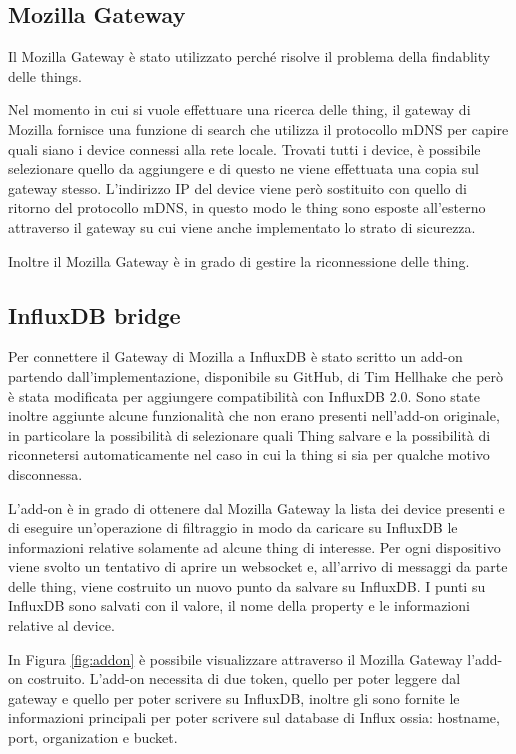 \documentclass{article}
\begin{document}
\subsection{Mozilla Gateway}
Il Mozilla Gateway è stato utilizzato perché risolve il problema della findablity delle things. 

Nel momento in cui si vuole effettuare una ricerca delle thing, il gateway di Mozilla fornisce una funzione di search che utilizza il protocollo mDNS per capire quali siano i device connessi alla rete locale. Trovati tutti i device, è possibile selezionare quello da aggiungere e di questo ne viene effettuata una copia sul gateway stesso.
L'indirizzo IP del device viene però sostituito con quello di ritorno del protocollo mDNS, in questo modo le thing sono esposte all'esterno attraverso il gateway su cui viene anche implementato lo strato di sicurezza. 

Inoltre il Mozilla Gateway è in grado di gestire la riconnessione delle thing.


\subsection{InfluxDB bridge}

Per connettere il Gateway di Mozilla a InfluxDB  è stato scritto un add-on partendo dall'implementazione, disponibile su GitHub, di Tim Hellhake \cite{influxdbBridge} che però è stata modificata per aggiungere compatibilità con InfluxDB 2.0. Sono state inoltre aggiunte alcune funzionalità che non erano presenti nell'add-on originale, in particolare la possibilità di selezionare quali Thing salvare e la possibilità di riconnetersi automaticamente nel caso in cui la thing si sia per qualche motivo disconnessa.


L'add-on è in grado di ottenere dal Mozilla Gateway la lista dei device presenti e di eseguire un'operazione di filtraggio in modo da caricare su InfluxDB le informazioni relative solamente ad alcune thing di interesse.
Per ogni dispositivo viene svolto un tentativo di aprire un websocket e, all'arrivo di messaggi da parte delle thing, viene costruito un nuovo punto da salvare su InfluxDB. 
I punti su InfluxDB sono salvati con il valore, il nome della property e le informazioni relative al device.

In Figura \ref{fig:addon} è possibile visualizzare attraverso il Mozilla Gateway l'add-on costruito. L'add-on necessita di due token, quello per poter leggere dal gateway e quello per poter scrivere su InfluxDB, inoltre gli sono fornite le informazioni principali per poter scrivere sul database di Influx ossia: hostname, port, organization e bucket.
\end{document}
